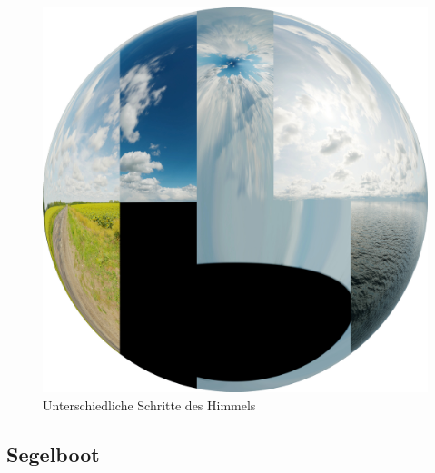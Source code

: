 \begin{figure}[H]
\includegraphics[width=\textwidth]{gfx/prod/env/env.jpg}
\caption{Unterschiedliche Schritte des Himmels}
\label{env}
\end{figure}

\subsection{Segelboot}


